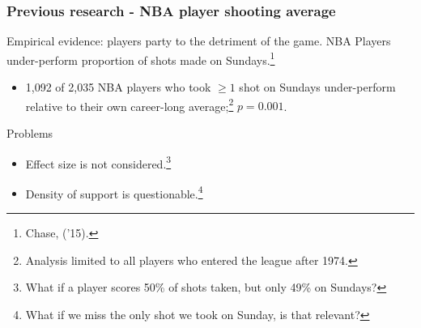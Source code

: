 \documentclass{beamer}
\begin{document}


\begin{frame}
  \frametitle{Previous research - NBA player shooting average}
  \begin{block}{Empirical evidence: players party to the detriment of the game.}
  NBA Players under-perform proportion of shots made on Sundays.\footnote{Chase, ('15).}
  \end{block}
    \begin{itemize}       
    \item 1,092 of 2,035 NBA players who took $\geq 1$ shot on Sundays       under-perform 
      relative to their own career-long average;\footnote{Analysis limited to all players who entered the league after 1974.} $p=0.001$.
    \end{itemize}
    \begin{block}{Problems}       \begin{itemize}           \item Effect size is not considered.\footnote{What if a player scores 50\% of shots taken, but only 49\% on Sundays?}
          \item Density of support is questionable.\footnote{What if we miss the only shot we took on Sunday, is that relevant?}            \end{itemize}     \end{block}
\end{frame}
\end{document}
